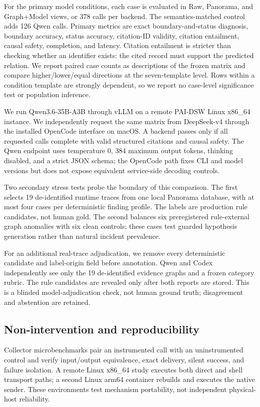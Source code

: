 \documentclass[runningheads]{llncs}
\begin{document}
For the primary model conditions, each case is evaluated in Raw, Panorama, and
Graph+Model views, or 378 calls per backend. The semantics-matched control adds
126 Qwen calls. Primary metrics are exact boundary-and-status diagnosis,
boundary accuracy, status accuracy, citation-ID validity, citation entailment,
causal safety, completion, and latency.  Citation entailment is stricter than
checking whether an identifier exists: the cited record must support the
predicted relation. We report paired case counts as descriptions of the frozen
matrix and compare higher/lower/equal directions at the seven-template level.
Rows within a condition template are strongly dependent, so we report no
case-level significance test or population inference.

We run Qwen3.6-35B-A3B through vLLM on a remote PAI-DSW Linux x86\_64 instance.
We independently request the same matrix from DeepSeek-v4 through the installed
OpenCode interface on macOS.  A backend passes only if all requested calls
complete with valid structured citations and causal safety.  The Qwen endpoint
uses temperature 0, 384 maximum output tokens, thinking disabled, and a strict
JSON schema; the OpenCode path fixes CLI and model versions but does not expose
equivalent service-side decoding controls.

Two secondary stress tests probe the boundary of this comparison.  The first
selects 19 de-identified runtime traces from one local Panorama database, with
at most four cases per deterministic finding profile.  The labels are production
rule candidates, not human gold.  The second balances six preregistered
rule-external graph anomalies with six clean controls; these cases test guarded
hypothesis generation rather than natural incident prevalence.

For an additional real-trace adjudication, we remove every deterministic
candidate and label-origin field before annotation. Qwen and Codex independently
see only the 19 de-identified evidence graphs and a frozen category rubric. The
rule candidates are revealed only after both reports are stored. This is a
blinded model-adjudication check, not human ground truth; disagreement and
abstention are retained.

\subsection{Non-intervention and reproducibility}

Collector microbenchmarks pair an instrumented call with an uninstrumented
control and verify input/output equivalence, exact delivery, silent success,
and failure isolation.  A remote Linux x86\_64 study executes both direct and
shell transport paths; a second Linux arm64 container rebuilds and executes the
native sender.  These environments test mechanism portability, not independent
physical-host reliability.
\end{document}
